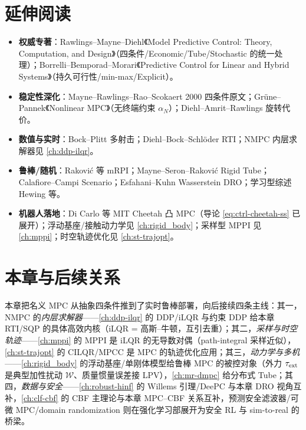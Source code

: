 \section*{延伸阅读}
\begin{itemize}
  \item \textbf{权威专著}：Rawlings--Mayne--Diehl《Model Predictive Control: Theory, Computation, and Design》（四条件/Economic/Tube/Stochastic 的统一处理\cite{rawlings2020mpc}）；Borrelli--Bemporad--Morari《Predictive Control for Linear and Hybrid Systems》（持久可行性/min-max/Explicit\cite{borrelli2017predictive}）。
  \item \textbf{稳定性深化}：Mayne--Rawlings--Rao--Scokaert 2000 四条件原文\cite{mayne2000constrained}；Grüne--Pannek《Nonlinear MPC》（无终端约束 $\alpha_N$\cite{gruenepannek2017nmpc}）；Diehl--Amrit--Rawlings 旋转代价\cite{diehl2011lyapunov}。
  \item \textbf{数值与实时}：Bock--Plitt 多射击\cite{bockplitt1984multiple}；Diehl--Bock--Schlöder RTI\cite{diehl2005realtime}；NMPC 内层求解器见 \cref{ch:ddp-ilqr}。
  \item \textbf{鲁棒/随机}：Raković 等 mRPI\cite{rakovic2005invariant}；Mayne--Seron--Raković Rigid Tube\cite{mayneseronrakovic2005tube}；Calafiore--Campi Scenario\cite{calafiorecampi2006scenario}；Esfahani--Kuhn Wasserstein DRO\cite{esfahanikuhn2018wasserstein}；学习型综述 Hewing 等\cite{hewing2020learning}。
  \item \textbf{机器人落地}：Di Carlo 等 MIT Cheetah 凸 MPC\cite{dicarlo2018cheetah}（导论 \cref{eq:ctrl-cheetah-ss} 已展开）；浮动基座/接触动力学见 \cref{ch:rigid_body}；采样型 MPPI 见 \cref{ch:mppi}；时空轨迹优化见 \cref{ch:st-trajopt}。
\end{itemize}

\section*{本章与后续关系}
本章把名义 MPC 从抽象四条件推到了实时鲁棒部署，向后接续四条主线：其一，NMPC 的\emph{内层求解器}——\cref{ch:ddp-ilqr} 的 DDP/iLQR 与约束 DDP 给本章 RTI/SQP 的具体高效内核（iLQR = 高斯--牛顿，互引去重）；其二，\emph{采样与时空轨迹}——\cref{ch:mppi} 的 MPPI 是 iLQR 的无导数对偶（path-integral 采样近似），\cref{ch:st-trajopt} 的 CILQR/MPCC 是 MPC 的轨迹优化应用；其三，\emph{动力学与多机}——\cref{ch:rigid_body} 的浮动基座/单刚体模型给鲁棒 MPC 的被控对象（外力 $\tau_{\rm ext}$ 是典型加性扰动 $\mathcal W$、质量惯量误差接 LPV），\cref{ch:mr-dmpc} 给分布式 Tube；其四，\emph{数据与安全}——\cref{ch:robust-hinf} 的 Willems 引理/DeePC 与本章 DRO 视角互补，\cref{ch:clf-cbf} 的 CBF 主理论与本章 MPC--CBF 关系互补，预测安全滤波器/可微 MPC/domain randomization 则在强化学习部展开为安全 RL 与 sim-to-real 的桥梁。

